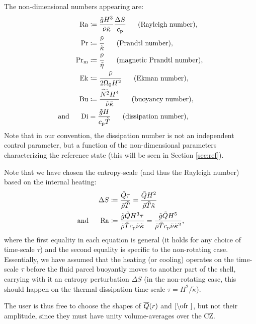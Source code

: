 \documentclass[12pt]{article}
\numberwithin{equation}{section}
\begin{document}
The non-dimensional numbers appearing are:
\begin{subequations}
\begin{align}
	{\rm{Ra}} &\coloneqq \frac{\tilde{g} H^3}{\tilde{\nu} \tilde{\kappa}} \frac{\Delta S}{c_{\rm{p}}}\ \ \ \ \ \text{(Rayleigh number)},\\ 
	{\rm{Pr}} &\coloneqq \frac{\tilde{\nu}}{\tilde{\kappa}}\ \ \ \ \ \text{(Prandtl number)},\\
	{\rm{Pr_m}} &\coloneqq \frac{\tilde{\nu}}{\tilde{\eta}}\ \ \ \ \ \text{(magnetic Prandtl number)},\\
	{\rm{Ek}} &\coloneqq \frac{\tilde{\nu}}{2\Omega_0H^2}\ \ \ \ \ \text{(Ekman number)},\\	
	{\rm{Bu}} &\coloneqq \frac{\widetilde{N^2}H^4}{\tilde{\nu}\tilde{\kappa}}\ \ \ \ \ \text{(buoyancy number)},\\
	\text{and}\ \ \ \ \  {\rm{Di}} &= \frac{\tilde{g}H}{c_{\rm{p}}\tilde{T}}\ \ \ \ \ \text{(dissipation number)},
\end{align}
\end{subequations}
Note that in our convention, the dissipation number is not an independent control parameter, but a function of the non-dimensional parameters characterizing the reference state (this will be seen in Section \ref{sec:ref}). 

Note that we have chosen the entropy-scale (and thus the Rayleigh number) based on the internal heating:
\begin{subequations}
\begin{align}
	\Delta S &\coloneqq \frac{\tilde{Q}\tau}{\tilde{\rho}\tilde{T}} = \frac{\tilde{Q}H^2}{\tilde{\rho}\tilde{T}\tilde{\kappa}}\label{eq:dsnonrot}\\
	\text{and}\ \ \ \ \  {\rm{Ra}} &\coloneqq \frac{\tilde{g} \tilde{Q} H^3\tau}{\tilde{\rho}\tilde{T}c_{\rm{p}}\tilde{\nu} \tilde{\kappa}} =  \frac{\tilde{g} \tilde{Q} H^5}{\tilde{\rho}\tilde{T}c_{\rm{p}}\tilde{\nu} \tilde{\kappa}^2},\label{eq:ranonrot}\\ 
\end{align}
\end{subequations}
where the first equality in each equation is general (it holds for any choice of time-scale $\tau$) and the second equality is specific to the non-rotating case. Essentially, we have assumed that the heating (or cooling) operates on the time-scale $\tau$ before the fluid parcel buoyantly moves to another part of the shell, carrying with it an entropy perturbation $\Delta S$ (in the non-rotating case, this should happen on the thermal dissipation time-scale $\tau=H^2/\tilde{\kappa}$). 

The user is thus free to choose the shapes of $\overline{Q}(r)$ and $\cref\ofr$, but not their amplitude, since they must have unity volume-averages over the CZ. 
\end{document}
